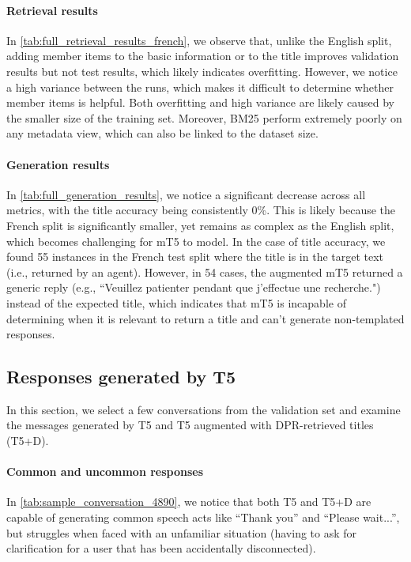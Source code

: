 \documentclass[11pt]{article}
\begin{document}
\paragraph{Retrieval results} In \autoref{tab:full_retrieval_results_french}, we observe that, unlike the English split, adding member items to the basic information or to the title improves validation results but not test results, which likely indicates overfitting. However, we notice a high variance between the runs, which makes it difficult to determine whether member items is helpful. Both overfitting and high variance are likely caused by the smaller size of the training set. Moreover, BM25 perform extremely poorly on any metadata view, which can also be linked to the dataset size.

\paragraph{Generation results} In \autoref{tab:full_generation_results}, we notice a significant decrease across all metrics, with the title accuracy being consistently 0\%. This is likely because the French split is significantly smaller, yet remains as complex as the English split, which becomes challenging for mT5 to model. In the case of title accuracy, we found 55 instances in the French test split where the title is in the target text (i.e., returned by an agent). However, in 54 cases, the augmented mT5 returned a generic reply (e.g., ``Veuillez patienter pendant que j'effectue une recherche.") instead of the expected title, which indicates that mT5 is incapable of determining when it is relevant to return a title and can't generate non-templated responses.

\subsection{Responses generated by T5}
\label{sec:appendix_case_study_t5}

In this section, we select a few conversations from the validation set and examine the messages generated by T5 and T5 augmented with DPR-retrieved titles (T5+D).

\paragraph{Common and uncommon responses} In \autoref{tab:sample_conversation_4890}, we notice that both T5 and T5+D are capable of generating common speech acts like ``Thank you'' and ``Please wait...'', but struggles when faced with an unfamiliar situation (having to ask for clarification for a user that has been accidentally disconnected).
\end{document}
